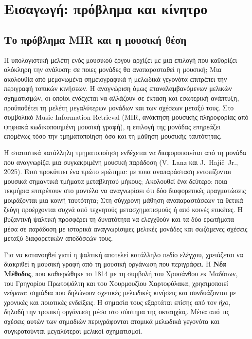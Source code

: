 \documentclass[11pt,a4paper]{article}
\begin{document}
\section{Εισαγωγή: πρόβλημα και κίνητρο}

\subsection{Το πρόβλημα MIR και η μουσική θέση}
Η υπολογιστική μελέτη ενός μουσικού έργου αρχίζει με μια επιλογή που καθορίζει ολόκληρη την ανάλυση: σε ποιες μονάδες θα αναπαρασταθεί η μουσική; Μια ακολουθία από μεμονωμένα σημειογραφικά ή μελωδικά γεγονότα επιτρέπει την περιγραφή τοπικών κινήσεων. Η αναγνώριση όμως επαναλαμβανόμενων μελικών σχηματισμών, οι οποίοι ενδέχεται να αλλάζουν σε έκταση και εσωτερική ανάπτυξη, προϋποθέτει τη μελέτη μεγαλύτερων μονάδων και των σχέσεων μεταξύ τους. Στο συμβολικό Music Information Retrieval (MIR, ανάκτηση μουσικής πληροφορίας από ψηφιακά κωδικοποιημένη μουσική γραφή), η επιλογή της μονάδας επηρεάζει επομένως τόσο την τμηματοποίηση όσο και τη μάθηση μουσικής ταυτότητας.

Η στατιστικά κατάλληλη τμηματοποίηση ενδέχεται να διαφοροποιείται από τη μονάδα που αναγνωρίζει μια συγκεκριμένη μουσική παράδοση (V.~Lanz και J.~Hajič~Jr., 2025). Έτσι προκύπτει ένα πρώτο ερώτημα: με ποια αναπαράσταση εντοπίζονται μουσικά σημαντικά τμήματα μεταβλητού μήκους; Ακολουθεί ένα δεύτερο: ποια τεκμήρια επιτρέπουν στο μοντέλο να αναγνωρίσει ότι δύο διαφορετικές πραγματώσεις μοιράζονται μια κοινή ταυτότητα; Στη σύγχρονη μάθηση αναπαραστάσεων τα θετικά ζεύγη προέρχονται συχνά από τεχνητούς μετασχηματισμούς ή από κοινές ετικέτες. Η βυζαντινή ψαλτική προσφέρει τη δυνατότητα να ελεγχθούν και τα δύο ερωτήματα μέσα σε παράδοση με ιστορικά αναγνωρίσιμες μελικές μονάδες και σωζόμενες σχέσεις μεταξύ διαφορετικών αποδόσεών τους.

Για να κατανοηθεί γιατί η ψαλτική αποτελεί κατάλληλο πεδίο ελέγχου, χρειάζεται να διακριθεί η μουσική γραφή από τη μουσική οργάνωση που περιγράφει. Η \textbf{Νέα Μέθοδος}, που καθιερώθηκε το 1814 με τη συμβολή του Χρυσάνθου εκ Μαδύτων, του Γρηγορίου Πρωτοψάλτη και του Χουρμουζίου Χαρτοφύλακα, χρησιμοποιεί \emph{νεύματα}: σημάδια που δηλώνουν σχετικές μελωδικές κινήσεις και συνδυάζονται με χρονικές και ποιοτικές ενδείξεις. Η σημασία τους εξαρτάται επίσης από τον \emph{ήχο}, δηλαδή την τροπική οργάνωση μέσα στο σύστημα της οκταηχίας. Μέσα από τις σχέσεις αυτών των σημαδιών περιγράφονται ατομικά μελωδικά γεγονότα και συγκροτούνται μεγαλύτεροι μελικοί σχηματισμοί.
\end{document}

